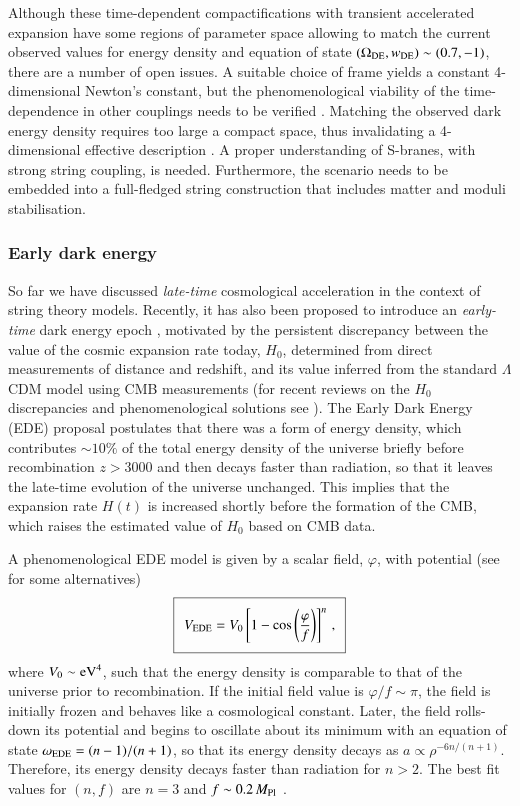 Although these time-dependent compactifications with transient accelerated expansion have some regions of parameter space allowing to match the current observed values for energy density and equation of state $(\Omega_{\rm DE},w_{\rm DE})\sim(0.7, -1)$, there are a number of open issues. A suitable choice of frame yields a constant 4-dimensional Newton's constant, but the phenomenological viability of the time-dependence in other couplings needs to be verified \cite{Russo:2018akp,Townsend:2021wrs}. Matching the observed dark energy density requires too large a compact space, thus invalidating a 4-dimensional effective description \cite{Gutperle:2003kc}. A proper understanding of S-branes, with strong string coupling, is needed.  Furthermore, the scenario needs to be embedded into a full-fledged string construction that includes matter and moduli stabilisation. 

\subsubsection{Early dark energy}\label{subs:EDE}

So far we have discussed {\em late-time} cosmological acceleration in the context of string theory models. Recently, it has also been proposed to introduce an {\em early-time} dark energy epoch \cite{Poulin:2018dzj,Poulin:2018cxd}, motivated by the persistent discrepancy between the value of the cosmic expansion rate today, $H_0$, determined from direct measurements of distance and redshift, and  its value inferred from    the standard $\Lambda$CDM model using CMB measurements (for recent reviews on the $H_0$ discrepancies and phenomenological solutions see \cite{DiValentino:2021izs, Schoneberg:2021qvd}).
The Early Dark Energy (EDE) proposal postulates that there was a form of energy density, which contributes $\sim10\%$ of the total energy density of the universe briefly before recombination $z>3000$ and then  decays faster than radiation, so that it leaves the late-time evolution of the universe unchanged. This implies that  the expansion rate $H(t)$ is increased shortly before the formation of the CMB, which raises the estimated value of $H_0$ based on CMB data.
  
A phenomenological EDE model is given by a scalar field, $\varphi$, with potential (see \cite{Hardy:2019apu, Niedermann:2021ijp} for some alternatives)
\begin{equation}
\setlength\fboxsep{0.25cm}
\setlength\fboxrule{0.4pt}
\boxed{
\label{eq:VEDE}
V_{\rm EDE} = V_0\left[ 1- \cos \left(\frac{\varphi}{f}\right) \right]^n \,,
}
\end{equation}
where $V_0\sim {\rm eV}^4$, such that the energy density is comparable to that of the universe prior to recombination. If the initial field value is $\varphi/f\sim \pi$,  the field is initially frozen and behaves like a cosmological constant. Later, the field rolls-down its potential and begins to oscillate about its minimum with an equation of state $\omega_{\rm EDE} = (n-1)/(n+1)$, so that its energy density decays as $a\propto \rho^{-6n/(n+1)}$. Therefore, its energy density decays faster than radiation for $n>2$. The best fit values for $(n, f)$ are $n=3$ and $f\sim 0.2\, M_{\rm Pl}$ \cite{Poulin:2018cxd,McDonough:2021pdg}. 

